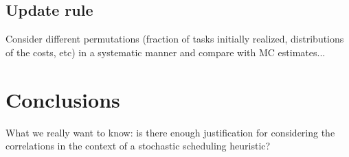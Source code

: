 \documentclass[12pt]{article}
\begin{document}
\subsection{Update rule}
\label{subsect.results_update_rule}

Consider different permutations (fraction of tasks initially realized, distributions of the costs, etc) in a systematic manner and compare with MC estimates... 

\section{Conclusions}
\label{sect.conclusions}

What we really want to know: is there enough justification for considering the correlations in the context of a stochastic scheduling heuristic? 



\end{document}
